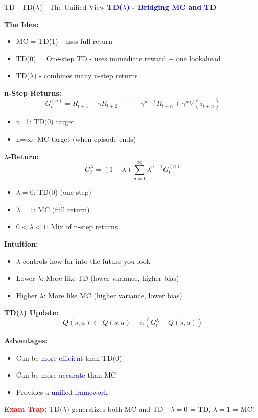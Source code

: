 \documentclass[8pt]{beamer}
\begin{document}
	\begin{frame}{TD - TD($\lambda$) - The Unified View}
		\fontsize{6.5}{7.5}\selectfont
		\textcolor{blue}{\textbf{TD($\lambda$) - Bridging MC and TD}}
		
		\textbf{The Idea:}
		\begin{itemize}
			\item MC = TD(1) - uses full return
			\item TD(0) = One-step TD - uses immediate reward + one lookahead
			\item TD($\lambda$) - combines many n-step returns
		\end{itemize}
		
		\textbf{n-Step Returns:}
		\[
		G_t^{(n)} = R_{t+1} + \gamma R_{t+2} + \cdots + \gamma^{n-1} R_{t+n} + \gamma^n V(s_{t+n})
		\]
		\begin{itemize}
			\item n=1: TD(0) target
			\item n=$\infty$: MC target (when episode ends)
		\end{itemize}
		
		\textbf{$\lambda$-Return:}
		\[
		G_t^\lambda = (1-\lambda)\sum_{n=1}^{\infty} \lambda^{n-1} G_t^{(n)}
		\]
		\begin{itemize}
			\item $\lambda = 0$: TD(0) (one-step)
			\item $\lambda = 1$: MC (full return)
			\item $0 < \lambda < 1$: Mix of n-step returns
		\end{itemize}
		
		\textbf{Intuition:}
		\begin{itemize}
			\item $\lambda$ controls how far into the future you look
			\item Lower $\lambda$: More like TD (lower variance, higher bias)
			\item Higher $\lambda$: More like MC (higher variance, lower bias)
		\end{itemize}
		
		\textbf{TD($\lambda$) Update:}
		\[
		Q(s,a) \leftarrow Q(s,a) + \alpha(G_t^\lambda - Q(s,a))
		\]
		
		\textbf{Advantages:}
		\begin{itemize}
			\item Can be \textcolor{blue}{more efficient} than TD(0)
			\item Can be \textcolor{blue}{more accurate} than MC
			\item Provides a \textcolor{blue}{unified framework}
		\end{itemize}
		
		\textcolor{red}{\textbf{Exam Trap:}} TD($\lambda$) generalizes both MC and TD - $\lambda=0$ = TD, $\lambda=1$ = MC!
	\end{frame}
	
\end{document}

